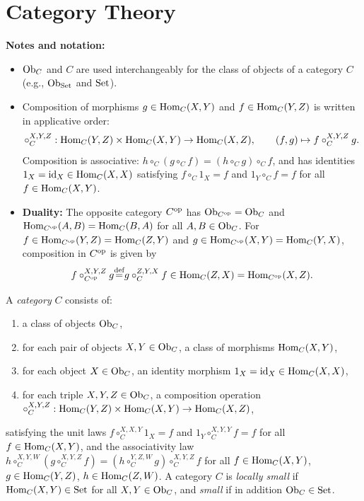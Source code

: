 \documentclass[10pt,a4paper]{article}
\begin{document}
\section{Category Theory}
\noindent\textbf{Notes and notation:}
\begin{itemize}
\item ${\textrm{Ob}}_C$ and $C$ are used interchangeably for the class of objects of a category $C$ (e.g., ${\textrm{Ob}}_{\textrm{Set}}$ and ${\textrm{Set}}$).
\item Composition of morphisms $g \in {\textrm{Hom}}_C(X,Y)$ and $f \in {\textrm{Hom}}_C(Y,Z)$ is written in applicative order:
$$\circ_C^{X,Y,Z} : {\textrm{Hom}}_C(Y,Z) \times {\textrm{Hom}}_C(X,Y) \to {\textrm{Hom}}_C(X,Z), \qquad (f, g) \mapsto f \circ_C^{X,Y,Z} g.$$
Composition is associative: $h \circ_C (g \circ_C f) = (h \circ_C g) \circ_C f$, and has identities $1_X = {\textrm{id}}_X \in {\textrm{Hom}}_C(X,X)$ satisfying $f \circ_C 1_X = f$ and $1_Y \circ_C f = f$ for all $f \in {\textrm{Hom}}_C(X,Y)$.
\item \textbf{Duality:} The opposite category $C^{\textrm{op}}$ has ${\textrm{Ob}}_{C^{\textrm{op}}} = {\textrm{Ob}}_C$ and ${\textrm{Hom}}_{C^{\textrm{op}}}(A,B) = {\textrm{Hom}}_C(B,A)$ for all $A,B \in {\textrm{Ob}}_C$. For $f \in {\textrm{Hom}}_{C^{\textrm{op}}}(Y,Z) = {\textrm{Hom}}_C(Z,Y)$ and $g \in {\textrm{Hom}}_{C^{\textrm{op}}}(X,Y) = {\textrm{Hom}}_C(Y,X)$, composition in $C^{\textrm{op}}$ is given by
$$f \circ_{C^{\textrm{op}}}^{X,Y,Z} g {\stackrel{{\textrm{def}}}{=}} g \circ_C^{Z,Y,X} f \in {\textrm{Hom}}_C(Z,X) = {\textrm{Hom}}_{C^{\textrm{op}}}(X,Z).$$
\end{itemize}

\begin{definition}\label{def:category}
A \emph{category} $C$ consists of:
\begin{enumerate}
\item a class of objects ${\textrm{Ob}}_C$,
\item for each pair of objects $X, Y \in {\textrm{Ob}}_C$, a class of morphisms ${\textrm{Hom}}_C(X,Y)$,
\item for each object $X \in {\textrm{Ob}}_C$, an identity morphism $1_X = {\textrm{id}}_X \in {\textrm{Hom}}_C(X,X)$,
\item for each triple $X, Y, Z \in {\textrm{Ob}}_C$, a composition operation $\circ_C^{X,Y,Z} : {\textrm{Hom}}_C(Y,Z) \times {\textrm{Hom}}_C(X,Y) \to {\textrm{Hom}}_C(X,Z)$,
\end{enumerate}
satisfying the unit laws $f \circ_C^{X,X,Y} 1_X = f$ and $1_Y \circ_C^{X,Y,Y} f = f$ for all $f \in {\textrm{Hom}}_C(X,Y)$, and the associativity law $h \circ_C^{X,Y,W} (g \circ_C^{X,Y,Z} f) = (h \circ_C^{Y,Z,W} g) \circ_C^{X,Y,Z} f$ for all $f \in {\textrm{Hom}}_C(X,Y)$, $g \in {\textrm{Hom}}_C(Y,Z)$, $h \in {\textrm{Hom}}_C(Z,W)$. A category $C$ is \emph{locally small} if ${\textrm{Hom}}_C(X,Y) \in {\textrm{Set}}$ for all $X, Y \in {\textrm{Ob}}_C$, and \emph{small} if in addition ${\textrm{Ob}}_C \in {\textrm{Set}}$.
\end{definition}
\end{document}
